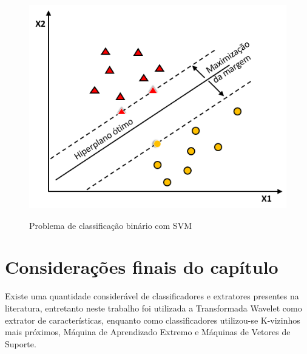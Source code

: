 \begin{figure}[H]
\centering
\caption{Problema de classificação binário com SVM}
\includegraphics[scale=0.60]{imgs/svm}
\label{fig:svm}
\end{figure}


\section{Considerações finais do capítulo}

Existe uma quantidade considerável de classificadores e extratores presentes na literatura, entretanto neste trabalho foi utilizada a Transformada Wavelet como extrator de características, enquanto como classificadores utilizou-se K-vizinhos mais próximos, Máquina de Aprendizado Extremo e Máquinas de Vetores de Suporte. 
